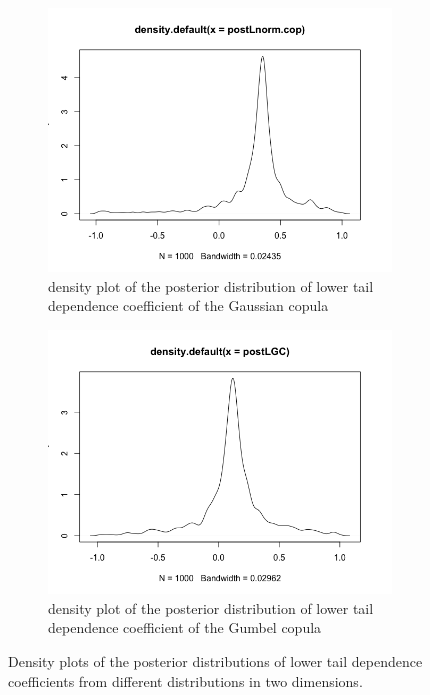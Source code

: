 \documentclass[mstat,12pt]{unswthesis}  %
\numberwithin{equation}{section}
\begin{document}
\begin{figure}[h]
\begin{subfigure}{.42\textwidth}
  \centering
  \includegraphics[width=\linewidth]{postLGau.png}  
  \caption{density plot of the posterior distribution of lower tail dependence coefficient of the Gaussian copula}
  \label{fig:sub-third}
\end{subfigure}
\begin{subfigure}{.42\textwidth}
  \centering
  \includegraphics[width=\linewidth]{postLGC.png}  
  \caption{density plot of the posterior distribution of lower tail dependence coefficient of the Gumbel copula}
  \label{fig:sub-fourth}
\end{subfigure}
\caption{Density plots of the posterior distributions of lower tail dependence coefficients from different distributions in two dimensions.}
\label{fig:fig}
\end{figure}
\end{document}
